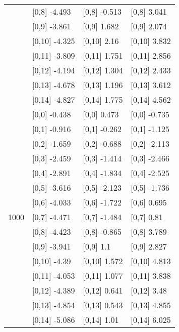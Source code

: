 \begin{table}
\begin{tabular}[t]{llll}
 & {}[0,8] -4.493 & {}[0,8] -0.513 & {}[0,8] 3.041\\
 & {}[0,9] -3.861 & {}[0,9] 1.682 & {}[0,9] 2.074\\
\addlinespace
 & {}[0,10] -4.325 & {}[0,10] 2.16 & {}[0,10] 3.832\\
 & {}[0,11] -3.809 & {}[0,11] 1.751 & {}[0,11] 2.856\\
 & {}[0,12] -4.194 & {}[0,12] 1.304 & {}[0,12] 2.433\\
 & {}[0,13] -4.678 & {}[0,13] 1.196 & {}[0,13] 3.612\\
 & {}[0,14] -4.827 & {}[0,14] 1.775 & {}[0,14] 4.562\\
\addlinespace
 & {}[0,0] -0.438 & {}[0,0] 0.473 & {}[0,0] -0.735\\
 & {}[0,1] -0.916 & {}[0,1] -0.262 & {}[0,1] -1.125\\
 & {}[0,2] -1.659 & {}[0,2] -0.688 & {}[0,2] -2.113\\
 & {}[0,3] -2.459 & {}[0,3] -1.414 & {}[0,3] -2.466\\
 & {}[0,4] -2.891 & {}[0,4] -1.834 & {}[0,4] -2.525\\
\addlinespace
 & {}[0,5] -3.616 & {}[0,5] -2.123 & {}[0,5] -1.736\\
 & {}[0,6] -4.033 & {}[0,6] -1.722 & {}[0,6] 0.695\\
1000 & {}[0,7] -4.471 & {}[0,7] -1.484 & {}[0,7] 0.81\\
 & {}[0,8] -4.423 & {}[0,8] -0.865 & {}[0,8] 3.789\\
 & {}[0,9] -3.941 & {}[0,9] 1.1 & {}[0,9] 2.827\\
\addlinespace
 & {}[0,10] -4.39 & {}[0,10] 1.572 & {}[0,10] 4.813\\
 & {}[0,11] -4.053 & {}[0,11] 1.077 & {}[0,11] 3.838\\
 & {}[0,12] -4.389 & {}[0,12] 0.641 & {}[0,12] 3.48\\
 & {}[0,13] -4.854 & {}[0,13] 0.543 & {}[0,13] 4.855\\
 & {}[0,14] -5.086 & {}[0,14] 1.01 & {}[0,14] 6.025\\
\bottomrule
\end{tabular}
\end{table}
